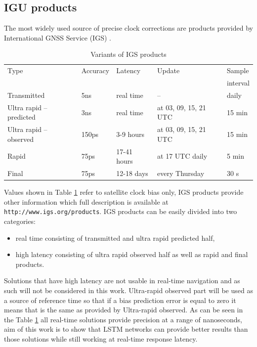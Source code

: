 \subsection{IGU products}
The most widely used source of precise clock corrections are products provided 
by International GNSS Service (IGS) \cite{IGS}.
\begin{table}[ht] 
	\centering
	\caption{Variants of IGS products}
	\label{tab:igs_products}
	\begin{tabular*}{\textwidth}{*{5}{l}}
		\hline
		\hline
		Type& Accuracy& Latency& Update& Sample \\
		&&&&interval\\
		\hline
		Transmitted & 5ns & real time & -- & daily  \\
		Ultra rapid -- predicted & 3ns & real time & at 03, 09, 15, 21 UTC & 15 min  \\
		Ultra rapid -- observed & 150ps & 3-9 hours & at 03, 09, 15, 21 UTC & 15 min  \\
		Rapid & 75ps & 17-41 hours & at 17 UTC daily & 5 min \\
		Final & 75ps & 12-18 days & every Thursday & 30 s \\
		\hline
		\hline
	\end{tabular*}
\end{table}
Values shown in Table \ref{tab:igs_products} refer to satellite clock bias only,  IGS products
provide other information which full description  is available at  
\texttt{http://www.igs.org/products}.
IGS products can be easily divided into two categories:
\begin{itemize}
	\item real time consisting of transmitted and ultra rapid predicted half,
	\item high latency consisting of ultra rapid observed half as well as rapid and final products.
\end{itemize}
Solutions that have high latency are not usable in real-time navigation and as such will not be
considered in this work. Ultra-rapid observed part will be used as a source of
reference time so that if a bias prediction error is equal to zero it means that is
the same as provided by Ultra-rapid observed.
As can be seen in the Table \ref{tab:igs_products} all real-time solutions provide precision 
at a range of nanoseconds, aim of this work is to show that LSTM networks can provide 
better results than those solutions while still working at real-time response latency.

